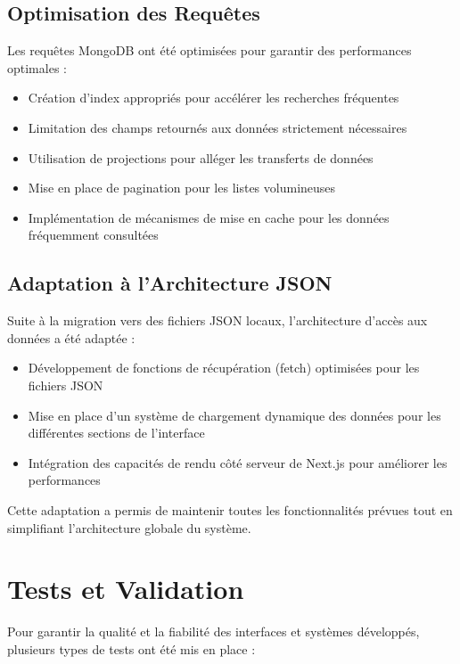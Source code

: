 \subsection{Optimisation des Requêtes}

Les requêtes MongoDB ont été optimisées pour garantir des performances optimales :

\begin{itemize}
  \item Création d'index appropriés pour accélérer les recherches fréquentes
  \item Limitation des champs retournés aux données strictement nécessaires
  \item Utilisation de projections pour alléger les transferts de données
  \item Mise en place de pagination pour les listes volumineuses
  \item Implémentation de mécanismes de mise en cache pour les données fréquemment consultées
\end{itemize}

\subsection{Adaptation à l'Architecture JSON}

Suite à la migration vers des fichiers JSON locaux, l'architecture d'accès aux données a été adaptée :

\begin{itemize}
  \item Développement de fonctions de récupération (fetch) optimisées pour les fichiers JSON
  \item Mise en place d'un système de chargement dynamique des données pour les différentes sections de l'interface
  \item Intégration des capacités de rendu côté serveur de Next.js pour améliorer les performances
\end{itemize}

Cette adaptation a permis de maintenir toutes les fonctionnalités prévues tout en simplifiant l'architecture globale du système.

\section{Tests et Validation}

Pour garantir la qualité et la fiabilité des interfaces et systèmes développés, plusieurs types de tests ont été mis en place :

